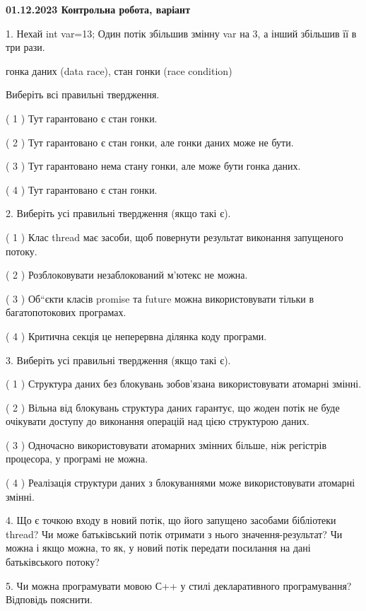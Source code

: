 \documentclass[12pt, ukrainian]{article}
\begin{document}
\begin {large}

\textbf{01.12.2023 Контрольна робота, варіант  }\par


{
1. Нехай int var=13; Один потік збільшив змінну var на 3, а інший збільшив її в три рази.

гонка даних (data race), стан гонки (race condition)

Виберіть всі правильні твердження.\par
\vspace{2mm}
( 1 ) Тут гарантовано є стан гонки.%

( 2 ) Тут гарантовано є стан гонки, але гонки даних може не бути.%

( 3 ) Тут гарантовано нема стану гонки, але може бути гонка даних.%

( 4 ) Тут гарантовано є стан гонки.%


\vspace{5mm}
2. Виберіть усі правильні твердження (якщо такі є).\par
\vspace{2mm}

( 1 ) Клас thread має засоби, щоб повернути результат виконання запущеного потоку.%

( 2 ) Розблоковувати незаблокований м’ютекс не можна.%

( 3 ) Об“єкти класів promise та future можна використовувати тільки в багатопотокових програмах.%

( 4 ) Критична секція це неперервна ділянка коду програми.%


\vspace{5mm}
3. Виберіть усі правильні твердження (якщо такі є).\par
\vspace{2mm}

( 1 ) Структура даних без блокувань зобов’язана використовувати атомарні змінні.%

( 2 ) Вільна від блокувань структура даних гарантує, що жоден потік не буде очікувати доступу до виконання операцій над цією структурою даних.%

( 3 ) Одночасно використовувати атомарних змінних більше, ніж регістрів процесора, у програмі не можна.%

( 4 ) Реалізація структури даних з блокуваннями може використовувати атомарні змінні.%


\vspace{5mm}
4. Що є точкою входу в новий потік, що його запущено засобами бібліотеки thread? Чи може батьківський потік отримати з нього значення-результат? Чи можна і якщо можна, то як, у новий потік передати посилання на дані батьківського потоку?



\vspace{5mm}
5. Чи можна програмувати мовою С++ у стилі декларативного програмування? Відповідь пояснити.
}
\end {large}
\end{document}
